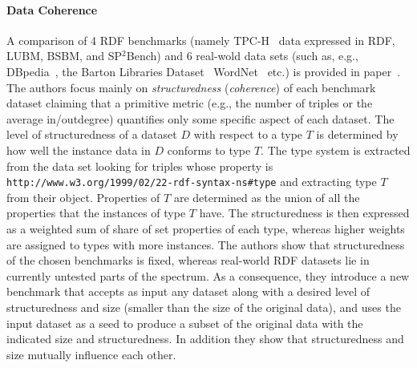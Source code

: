 
\paragraph{Data Coherence}  A comparison of 4 RDF benchmarks (namely TPC-H~\cite{TPC-H} data expressed in RDF, LUBM, BSBM, and SP$^2$Bench) and 6 real-wold data sets (such as, e.g.,  DBpedia~\cite{Bizer:2009:DCP:1640541.1640848}, the Barton Libraries Dataset~\cite{barton-benchmark}
WordNet~\cite{Miller:1995:WLD:219717.219748} etc.) is provided in paper~\cite{Duan:2011:AOC:1989323.1989340}. The authors focus mainly on \emph{structuredness} (\emph{coherence}) of each benchmark dataset claiming that a primitive metric (e.g., the number of triples or the average in/outdegree) quantifies only some specific aspect of each dataset. The level of structuredness of a dataset $D$ with respect to a type $T$ is determined by how well the instance data in $D$ conforms to type $T$. The type system is extracted from the data set looking for triples whose property is \texttt{http://www.w3.org/1999/02/22-rdf-syntax-ns\#type} and extracting type $T$ from their object. Properties of $T$ are determined as the union of all the properties that the instances of type $T$ have. The structuredness is then expressed as a weighted sum of share of set properties of each type, whereas higher weights are assigned to types with more instances. The authors show that structuredness of the chosen benchmarks is fixed, whereas real-world RDF datasets lie in currently untested parts of the spectrum. As a consequence, they introduce a new benchmark that accepts as input any dataset along with a desired level of structuredness and size (smaller than the size of the original data), and uses the input dataset as a seed to produce a subset of the original data with the indicated size and structuredness. In addition they show that structuredness and size mutually influence each other.


